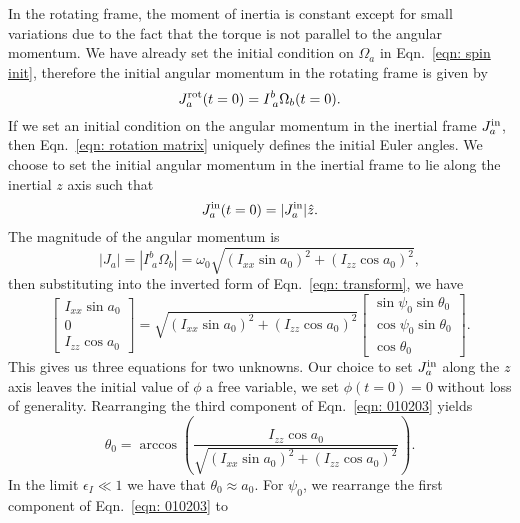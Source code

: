 \documentclass[../full_thesis/full_thesis.tex]{subfiles}
\begin{document}
In the rotating frame, the moment of inertia is constant except for small variations
due to the fact that the torque is not parallel to the angular momentum.
We have already set the initial condition on $\Omega_a$ in Eqn.~\eqref{eqn:
spin init}, therefore the initial angular momentum in the rotating frame is given by
\begin{equation}
  J^{\textrm{rot}}_a(t=0) = I^{b}_{\; a} \Omega_b(t=0).
\end{equation}
If we set an initial condition on the angular momentum in the inertial frame
$J^{\textrm{in}}_a$, then Eqn.~\eqref{eqn: rotation matrix} uniquely defines the initial
Euler angles. We choose to set the initial angular momentum in the inertial
frame to lie along the inertial $z$ axis such that
\begin{equation}
  J^{\textrm{in}}_a(t=0) = |J^{\textrm{in}}_a| \hat{z}.
\end{equation}
The magnitude of the angular momentum is
\begin{equation}
|J_a| = |I^{b}_{\; a} \Omega_{b}|=\omega_{0}\sqrt{(I_{xx}\sin a_{0})^{2} + (I_{zz}\cos a_{0})^{2}},
\end{equation}
then substituting into the inverted form of Eqn.~\eqref{eqn: transform}, we have
\begin{equation}
\left[ \begin{array}{c}
I_{xx}\sin a_{0} \\
0 \\
I_{zz} \cos a_{0}
\end{array}\right] =
\sqrt{(I_{xx}\sin a_{0})^{2} + (I_{zz}\cos a_{0})^{2}}
\left[ \begin{array}{c}
\sin \psi_{0} \sin \theta_{0} \\
\cos \psi_{0} \sin \theta_{0} \\
\cos \theta_{0}
\end{array}\right].
\label{eqn: 010203}
\end{equation}
This gives us three equations for two unknowns. Our choice to set $J^{\textrm{in}}_a$ along
the $z$ axis leaves the initial value of $\phi$ a free variable,
we set $\phi(t=0) = 0$ without loss of generality.
Rearranging the third component of Eqn.~\eqref{eqn: 010203} yields
\begin{equation}
\theta_{0} = \arccos\left(\frac{I_{zz}\cos a_{0}}{ \sqrt{(I_{xx}\sin
        a_{0})^{2} + (I_{zz}\cos a_{0})^{2}}} \right).
\label{eqn: theta init}
\end{equation}
In the limit $\epsilon_{I} \ll 1$ we have that $\theta_{0} \approx a_{0}$.
For $\psi_0$, we rearrange the first component of Eqn.~\eqref{eqn: 010203} to
\end{document}
